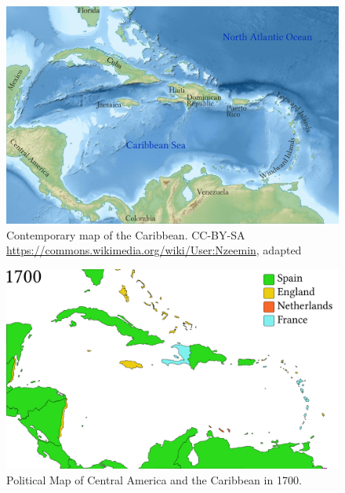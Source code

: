 \begin{figure}
\caption{\label{fig:key:3.3}  Contemporary map of the Caribbean. 
{\tiny CC-BY-SA \url{https://commons.wikimedia.org/wiki/User:Nzeemin}, adapted}
}

 

\includegraphics[width=\textwidth]{figures/img3-base.pdf}
 
\end{figure}

\begin{figure}

 

\includegraphics[width=\textwidth]{figures/img4-base.pdf}

\caption{\label{fig:key:3.4} Political Map of Central America and the Caribbean in 1700. 
}
\end{figure}

